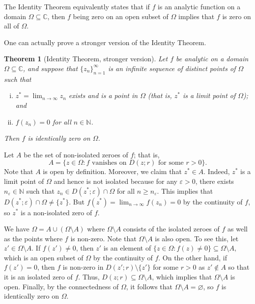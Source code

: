 \documentclass[10pt]{article}
\makeatletter
\newcommand{\eps}{\varepsilon}
\newcommand{\C}{\mathbb{C}}
\newcommand{\N}{\mathbb{N}}
\theoremstyle{newstyle}
\newtheorem{thm}{Theorem}[section]
\newenvironment{pf}[1][\proofname]{\par
  \pushQED{\qed}%
  \normalfont \topsep0\p@\relax
  \trivlist
  \item[\hskip\labelsep\scshape
  #1\@addpunct{.}]\ignorespaces
}{%
  \popQED\endtrivlist\@endpefalse
}
\makeatother
\begin{document}
The Identity Theorem equivalently states that if $f$ is an analytic function on a domain 
$\Omega \subseteq \C$, then $f$ being zero on an open subset of $\Omega$ implies that 
$f$ is zero on all of $\Omega$. 

One can actually prove a stronger version of the Identity Theorem. 

\begin{thm}[Identity Theorem, stronger version]
Let $f$ be analytic on a domain $\Omega \subseteq \C$, and suppose that $\{z_n\}_{n=1}^\infty$
is an infinite sequence of distinct points of $\Omega$ such that
\begin{enumerate}[(i)]
    \item $z^* = \lim_{n\to\infty} z_n$ exists and is a point in $\Omega$ (that is, 
    $z^*$ is a limit point of $\Omega$); and 
    \item $f(z_n) = 0$ for all $n \in \N$. 
\end{enumerate}
Then $f$ is identically zero on $\Omega$. 
\end{thm}
\begin{pf}
Let $A$ be the set of non-isolated zeroes of $f$; that is, 
\[ A = \{z \in \Omega : f \text{ vanishes on $D(z; r)$ for some $r > 0$}\}. \]
Note that $A$ is open by definition. Moreover, we claim that $z^* \in A$. 
Indeed, $z^*$ is a limit point of $\Omega$ and hence is not isolated because for any 
$\eps > 0$, there exists $n_{\eps} \in \N$ such that $z_n \in D(z^*; \eps) \cap \Omega$ 
for all $n \geq n_{\eps}$. This implies that $D(z^*; \eps) \cap \Omega \neq \{z^*\}$. 
But $f(z^*) = \lim_{n\to\infty} f(z_n) = 0$ by the continuity of $f$, so $z^*$ is a 
non-isolated zero of $f$. 

We have $\Omega = A \cup (\Omega \setminus A)$ where $\Omega \setminus A$ consists of the isolated 
zeroes of $f$ as well as the points where $f$ is non-zero. Note that $\Omega \setminus A$ 
is also open. To see this, let $z' \in \Omega \setminus A$. If $f(z') \neq 0$, then $z'$ is an 
element of $\{z \in \Omega : f(z) \neq 0\} \subseteq \Omega \setminus A$, which is an open 
subset of $\Omega$ by the continuity of $f$. On the other hand, if $f(z') = 0$, then 
$f$ is non-zero in $D(z'; r) \setminus \{z'\}$ for some $r > 0$ as $z' \notin A$ so that 
it is an isolated zero of $f$. Thus, $D(z; r) \subseteq \Omega \setminus A$, which implies that 
$\Omega \setminus A$ is open. Finally, by the connectedness of $\Omega$, it follows that 
$\Omega \setminus A = \varnothing$, so $f$ is identically zero on $\Omega$. 
\end{pf}
\end{document}
